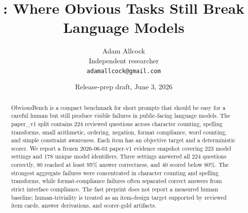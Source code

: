 \documentclass[11pt]{article}
\title{\benchmarkname: Where Obvious Tasks Still Break Language Models}
\author{Adam Allcock\\
Independent researcher\\
\texttt{adamallcock@gmail.com}}
\date{Release-prep draft, June 3, 2026}
\newcommand{\benchmarkname}{ObviousBench}
\newcommand{\paperSplit}{paper\_v1}
\begin{document}
\maketitle

\begin{abstract}
\benchmarkname{} is a compact benchmark for short prompts that should be easy
for a careful human but still produce visible failures in public-facing language
models. The \paperSplit{} split contains 224 reviewed questions across character
counting, spelling transforms, small arithmetic, ordering, negation, format
compliance, word counting, and simple constraint awareness. Each item has an
objective target and a deterministic scorer. We report a frozen 2026-06-03
paper-v1 evidence snapshot covering 223 model settings and 178 unique model
identifiers. Three settings answered all 224 questions correctly, 80 reached
at least 95\% answer correctness, and 40 scored below 80\%. The strongest
aggregate failures were concentrated in character counting and spelling
transforms, while format-compliance failures often separated correct answers
from strict interface compliance. The fast preprint does not report a measured
human baseline; human-triviality is treated as an item-design target supported
by reviewed item cards, answer derivations, and scorer-gold artifacts.
\end{abstract}






\clearpage




\clearpage




\end{document}
